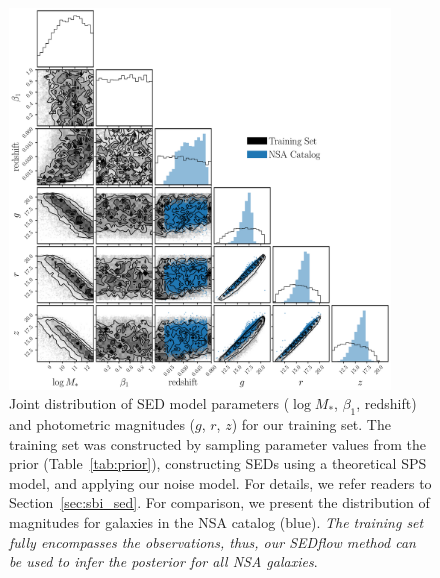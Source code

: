 \begin{figure}
\begin{center}
\includegraphics[width=0.9\textwidth]{figs/training.pdf}
    \caption{\label{fig:data}
    Joint distribution of SED model parameters ($\log M_*$, $\beta_1$,
    redshift) and photometric magnitudes ($g$, $r$, $z$) for our training set.
    The training set was constructed by sampling parameter values from the
    prior (Table~\ref{tab:prior}), constructing SEDs using a theoretical SPS
    model, and applying our noise model. 
    For details, we refer readers to Section~\ref{sec:sbi_sed}.
    For comparison, we present the distribution of magnitudes for galaxies in
    the NSA catalog (blue). 
    \emph{The training set fully encompasses the observations, thus, our 
    {\sc SEDflow} method can be used to infer the posterior for all NSA
    galaxies}.
    }
\end{center}
\end{figure}


